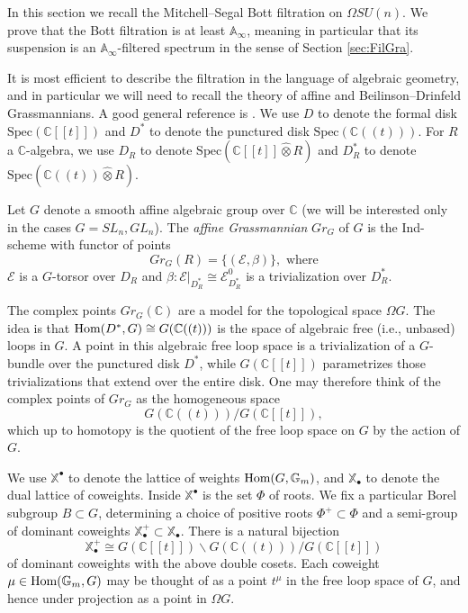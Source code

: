 In this section we recall the Mitchell--Segal Bott filtration \cite{MitchellLoopGroup} on $\Omega SU(n)$.  We prove that the Bott filtration is at least $\mathbb{A}_\infty$, meaning in particular that its suspension is an $\mathbb{A}_\infty$-filtered spectrum in the sense of Section \ref{sec:FilGra}.

It is most efficient to describe the filtration in the language of algebraic geometry, and in particular we will need to recall the theory of affine and Beilinson--Drinfeld Grassmannians.  A good general reference is \cite{Zhu}.  We use $D$ to denote the formal disk $\text{Spec}(\mathbb{C}[[t]])$ and $D^*$ to denote the punctured disk $\text{Spec}(\mathbb{C}((t)))$.  For $R$ a $\mathbb{C}$-algebra, we use $D_R$ to denote $\text{Spec}(\mathbb{C}[[t]] \hat{\otimes} R)$ and $D^*_R$ to denote $\text{Spec}(\mathbb{C}((t)) \hat{\otimes} R)$.

\begin{dfn}
Let $G$ denote a smooth affine algebraic group over $\mathbb{C}$ (we will be interested only in the cases $G=SL_n,GL_n$).  The \textit{affine Grassmannian} $Gr_G$ of $G$ is the Ind-scheme with functor of points
$$Gr_G(R) = \{(\mathcal{E},\beta)\},\text{ where}$$
$\mathcal{E}$ is a $G$-torsor over $D_{R}$ and $\beta:\mathcal{E}|_{D^*_{R}} \cong \mathcal{E}^0_{D^*_{R}}$ is a trivialization over $D^*_{R}$.
\end{dfn}

The complex points $Gr_G(\mathbb{C})$ are a model for the topological space $\Omega G$.  The idea is that $\operatorname{\text{Hom}}(D^*,G) \cong G(\mathbb{C}((t)))$ is the space of algebraic free (i.e., unbased) loops in $G$.  A point in this algebraic free loop space is a trivialization of a $G$-bundle over the punctured disk $D^*$, while $G(\mathbb{C}[[t]])$ parametrizes those trivializations that extend over the entire disk.  One may therefore think of the complex points of $Gr_G$ as the homogeneous space
$$G(\mathbb{C}((t)))/G(\mathbb{C}[[t]]),$$
which up to homotopy is the quotient of the free loop space on $G$ by the action of $G$.

We use $\mathbb{X}^{\bullet}$ to denote the lattice of weights $\operatorname{\text{Hom}}(G,\mathbb{G}_m)$, and $\mathbb{X}_{\bullet}$ to denote the dual lattice of coweights.  Inside $\mathbb{X}^{\bullet}$ is the set $\Phi$ of roots.  We fix a particular Borel subgroup $B \subset G$, determining a choice of positive roots $\Phi^+ \subset \Phi$ and a semi-group of dominant coweights $\mathbb{X}^+_\bullet \subset \mathbb{X}_\bullet$.  There is a natural bijection
$$\mathbb{X}_{\bullet}^+ \cong G(\mathbb{C}[[t]])\backslash G(\mathbb{C}((t)))/G(\mathbb{C}[[t]])$$
of dominant coweights with the above double cosets.  Each coweight $\mu \in \operatorname{\text{Hom}}(\mathbb{G}_m,G)$ may be thought of as a point $t^{\mu}$ in the free loop space of $G$, and hence under projection as a point in $\Omega G$.

